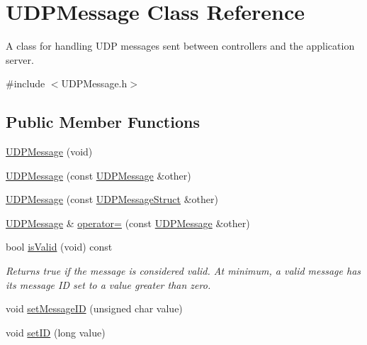\hypertarget{class_u_d_p_message}{}\section{U\+D\+P\+Message Class Reference}
\label{class_u_d_p_message}


A class for handling U\+DP messages sent between controllers and the application server.  




{\ttfamily \#include $<$U\+D\+P\+Message.\+h$>$}

\subsection*{Public Member Functions}
\begin{DoxyCompactItemize}
\item 
\hyperlink{class_u_d_p_message_a823351519fc5818ccc03030c6947e620}{U\+D\+P\+Message} (void)
\item 
\hyperlink{class_u_d_p_message_adbc0139ef0249efd4a932bbc0b57fe13}{U\+D\+P\+Message} (const \hyperlink{class_u_d_p_message}{U\+D\+P\+Message} \&other)
\item 
\hyperlink{class_u_d_p_message_a6edf87f4f8f441edf2064d5f6fa5cd02}{U\+D\+P\+Message} (const \hyperlink{struct_u_d_p_message_struct}{U\+D\+P\+Message\+Struct} \&other)
\item 
\hyperlink{class_u_d_p_message}{U\+D\+P\+Message} \& \hyperlink{class_u_d_p_message_af3bb7f16fec948bcfbf99646b79c5c58}{operator=} (const \hyperlink{class_u_d_p_message}{U\+D\+P\+Message} \&other)
\item 
\mbox{\label{class_u_d_p_message_ad732ecdc07825ce944b251b0e8f55e90}} 
bool \hyperlink{class_u_d_p_message_ad732ecdc07825ce944b251b0e8f55e90}{is\+Valid} (void) const
\begin{DoxyCompactList}\small\item\em Returns true if the message is considered valid. At minimum, a valid message has its message ID set to a value greater than zero. \end{DoxyCompactList}\item 
void \hyperlink{class_u_d_p_message_aba4aadebe7b1aa92ba558f3cd4319e79}{set\+Message\+ID} (unsigned char value)
\item 
void \hyperlink{class_u_d_p_message_a2fcacc64fbb5598848a391c9fd9aa8c2}{set\+ID} (long value)
\item 

\end{DoxyCompactItemize}
